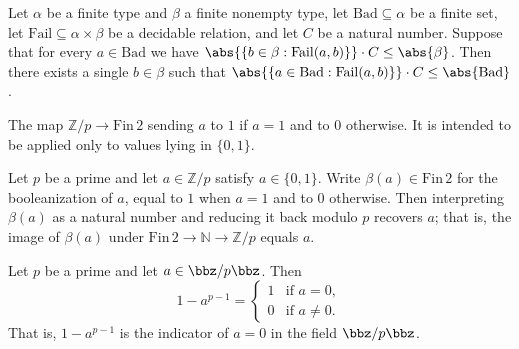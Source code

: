 \begin{lemma}
\label{RazborovSmolensky.prob_method_averaging}
\leanok
{}
Let $\alpha$ be a finite type and $\beta$ a finite nonempty type, let $\mathrm{Bad}
\subseteq \alpha$ be a finite set, let $\mathrm{Fail} \subseteq \alpha \times \beta$ be
a decidable relation, and let $C$ be a natural number. Suppose that for every $a \in
\mathrm{Bad}$ we have $\abs{\{b \in \beta : \mathrm{Fail}(a,b)\}} \cdot C \le
\abs{\beta}$. Then there exists a single $b \in \beta$ such that $\abs{\{a \in
\mathrm{Bad} : \mathrm{Fail}(a,b)\}} \cdot C \le \abs{\mathrm{Bad}}$.
\end{lemma}

\begin{definition}
\label{RazborovSmolensky.bitify}
\leanok
The map $\mathbb{Z}/p \to \mathrm{Fin}\,2$ sending $a$ to $1$ if $a = 1$ and to $0$
otherwise. It is intended to be applied only to values lying in $\{0,1\}$.
\end{definition}

\begin{lemma}
\label{RazborovSmolensky.cast_bitify_eq}
\leanok
{}
Let $p$ be a prime and let $a \in \mathbb{Z}/p$ satisfy $a \in \{0, 1\}$. Write
$\beta(a) \in \mathrm{Fin}\,2$ for the booleanization of $a$, equal to $1$ when $a = 1$
and to $0$ otherwise. Then interpreting $\beta(a)$ as a natural number and reducing it
back modulo $p$ recovers $a$; that is, the image of $\beta(a)$ under $\mathrm{Fin}\,2
\to \mathbb{N} \to \mathbb{Z}/p$ equals $a$.
\end{lemma}

\begin{lemma}
\label{RazborovSmolensky.one_sub_pow_card_sub_one}
\leanok
{}
Let $p$ be a prime and let $a \in \bbz/p\bbz$. Then
\[
1 - a^{p-1} = \begin{cases} 1 & \text{if } a = 0,\\ 0 & \text{if } a \neq 0.\end{cases}
\]
That is, $1 - a^{p-1}$ is the indicator of $a = 0$ in the field $\bbz/p\bbz$.
\end{lemma}

